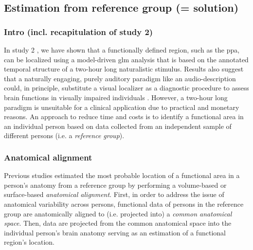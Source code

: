 \subsection{Estimation from reference group (= solution)}

\subsubsection{Intro (incl. recapitulation of study 2)}


In study 2 \citep{haeusler2022processing}, we have shown that a functionally
defined region, such as the \ac{ppa}, can be localized using a model-driven
\ac{glm} analysis that is based on the annotated temporal structure of a
two-hour long naturalistic stimulus.
Results also suggest that a naturally engaging, purely auditory paradigm like an
audio-description could, in principle, substitute a visual localizer as a
diagnostic procedure to assess brain functions in visually impaired individuals
\citep{haeusler2022processing}.
However, a two-hour long paradigm is unsuitable for a clinical application due
to practical and monetary reasons.
An approach to reduce time and costs is to identify a functional area in an
individual person based on data collected from an independent sample of
different persons (i.e. a \textit{reference group}).


\subsubsection{Anatomical alignment}

Previous studies estimated the most probable location of a functional area in a
person's anatomy from a reference group by performing a volume-based
\citep[e.g.,][]{zhen2017quantifying, zhen2015quantifying} or surface-based
\citep[e.g.,][]{frost2012measuring, weiner2018defining,
rosenke2021probabilistic, wang2015probabilistic} \textit{anatomical alignment}.
%
First, in order to address the issue of anatomical variability across persons,
functional data of persons in the reference group are anatomically aligned to
(i.e.  projected into) a \textit{common anatomical space}.
Then, data are projected from the common anatomical space into the individual
person's brain anatomy serving as an estimation of a functional region's
location.

